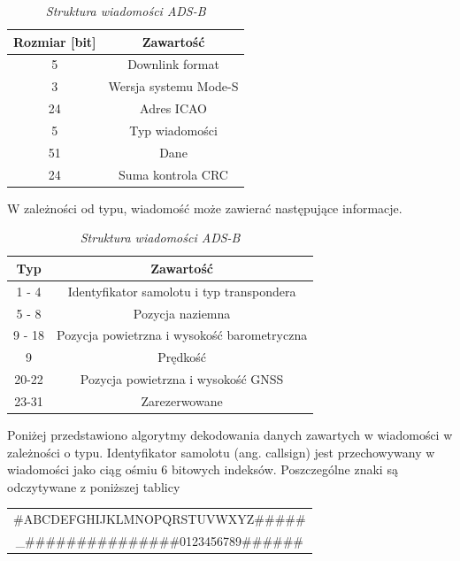 \documentclass[eng,printmode]{mgr}
\begin{document}
\begin{table}[htb]
\def\arraystretch{1.3}%
\caption{\textit{ Struktura wiadomości ADS-B}}
\label{tab:adsbFrame}
\begin{center}
\begin{tabular}{ |c|c| }
\hline
Rozmiar [bit] & Zawartość\\
\hline
5 & Downlink format\\
\hline
3 & Wersja systemu Mode-S\\
\hline
24 & Adres ICAO\\
\hline
5 & Typ wiadomości\\
\hline
51 & Dane\\
\hline
24 & Suma kontrola CRC\\
\hline
\end{tabular}
\end{center}
\end{table}
\noindent
W zależności od typu, wiadomość może zawierać następujące informacje.

\begin{table}[htb]
\def\arraystretch{1.3}%
\caption{\textit{ Struktura wiadomości ADS-B}}
\label{tab:adsbFrame}
\begin{center}
\begin{tabular}{ |c|c| }
\hline
Typ & Zawartość\\
\hline
1 - 4 & Identyfikator samolotu i typ transpondera\\
\hline
5 - 8 & Pozycja naziemna\\
\hline
9 - 18 &  Pozycja powietrzna i wysokość barometryczna\\
\hline
9 & Prędkość\\
\hline
20-22 &  Pozycja powietrzna i wysokość GNSS\\
\hline
23-31 & Zarezerwowane\\
\hline
\end{tabular}
\end{center}
\end{table}

\newpage
Poniżej przedstawiono algorytmy dekodowania danych zawartych w wiadomości w zależności o typu.
\vskip 0.5cm
Identyfikator samolotu (ang. callsign) jest przechowywany w wiadomości jako ciąg ośmiu 6 bitowych indeksów. Poszczególne znaki są odczytywane z poniższej tablicy 

\begin{table}[htb]
\label{tab:adsb}
  \centering
  \def\arraystretch{1.3}%
  \begin{tabular}{c}
       \#ABCDEFGHIJKLMNOPQRSTUVWXYZ\#\#\#\#\#\\
\_\#\#\#\#\#\#\#\#\#\#\#\#\#\#\#0123456789\#\#\#\#\#\#
 \end{tabular}
\end{table}
\end{document}
